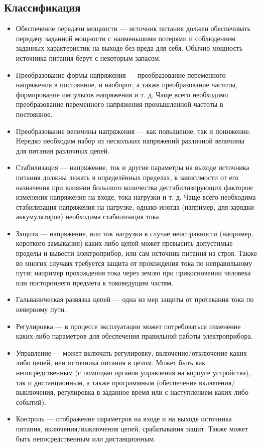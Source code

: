 \documentclass[unicode, 12pt, a4paper, oneside]{article}
\begin{document}
\subsection*{Классификация}

\begin{itemize}
\item Обеспечение передачи мощности — источник питания должен обеспечивать передачу заданной мощности с наименьшими потерями и соблюдением заданных характеристик на выходе без вреда для себя. Обычно мощность источника питания берут с некоторым запасом.
\item Преобразование формы напряжения — преобразование переменного напряжения в постоянное, и наоборот, а также преобразование частоты, формирование импульсов напряжения и т. д. Чаще всего необходимо преобразование переменного напряжения промышленной частоты в постоянное.
\item Преобразование величины напряжения — как повышение, так и понижение. Нередко необходим набор из нескольких напряжений различной величины для питания различных цепей.
\item Стабилизация — напряжение, ток и другие параметры на выходе источника питания должны лежать в определённых пределах, в зависимости от его назначения при влиянии большого количества дестабилизирующих факторов: изменения напряжения на входе, тока нагрузки и т. д. Чаще всего необходима стабилизация напряжения на нагрузке, однако иногда (например, для зарядки аккумуляторов) необходима стабилизация тока.
\item Защита — напряжение, или ток нагрузки в случае неисправности (например, короткого замыкания) каких-либо цепей может превысить допустимые пределы и вывести электроприбор, или сам источник питания из строя. Также во многих случаях требуется защита от прохождения тока по неправильному пути: например прохождения тока через землю при прикосновении человека или постороннего предмета к токоведущим частям.
\item Гальваническая развязка цепей — одна из мер защиты от протекания тока по неверному пути.
\item Регулировка — в процессе эксплуатации может потребоваться изменение каких-либо параметров для обеспечения правильной работы электроприбора.
\item Управление — может включать регулировку, включение/отключение каких-либо цепей, или источника питания в целом. Может быть как непосредственным (с помощью органов управления на корпусе устройства), так и дистанционным, а также программным (обеспечение включения/выключения, регулировка в заданное время или с наступлением каких-либо событий).
\item Контроль — отображение параметров на входе и на выходе источника питания, включения/выключения цепей, срабатывания защит. Также может быть непосредственным или дистанционным.
\end{itemize}
\end{document}
